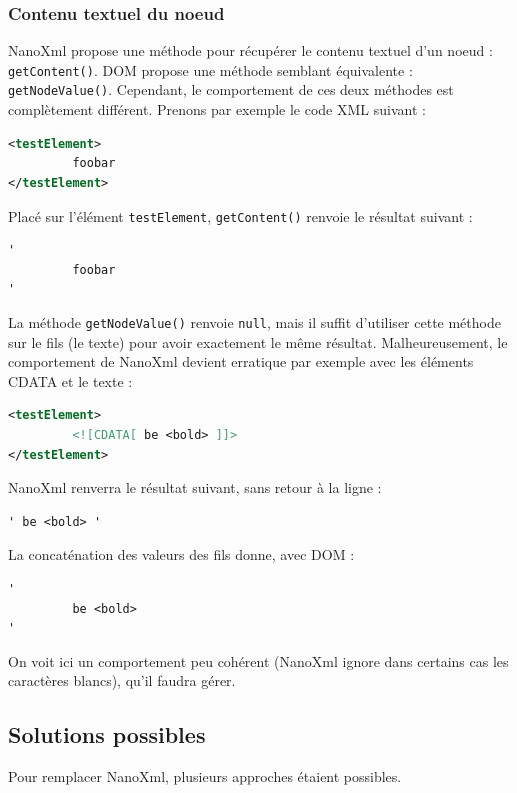 \subsubsection{Contenu textuel du noeud}
NanoXml propose une méthode pour récupérer le contenu textuel d'un noeud : \verb|getContent()|.
DOM propose une méthode semblant équivalente : \verb|getNodeValue()|.
Cependant, le comportement de ces deux méthodes est complètement différent.
Prenons par exemple le code XML suivant :
\begin{lstlisting}[language=xml]
<testElement>
         foobar
</testElement>
\end{lstlisting}
Placé sur l'élément \verb|testElement|, \verb|getContent()| renvoie le résultat suivant :
\begin{verbatim}
'
         foobar
'
\end{verbatim}
La méthode \verb|getNodeValue()| renvoie \verb|null|, mais il suffit d'utiliser cette méthode sur le fils (le texte) pour avoir exactement le même résultat.
Malheureusement, le comportement de NanoXml devient erratique par exemple avec les éléments CDATA et le texte :
\begin{lstlisting}[language=xml]
<testElement>
         <![CDATA[ be <bold> ]]>
</testElement>
\end{lstlisting}
NanoXml renverra le résultat suivant, sans retour à la ligne :
\begin{verbatim}
' be <bold> '
\end{verbatim}
La concaténation des valeurs des fils donne, avec DOM :
\begin{verbatim}
'
         be <bold>
'
\end{verbatim}
On voit ici un comportement peu cohérent (NanoXml ignore dans certains cas les caractères blancs), qu'il faudra gérer.

\subsection{Solutions possibles}
Pour remplacer NanoXml, plusieurs approches étaient possibles.

